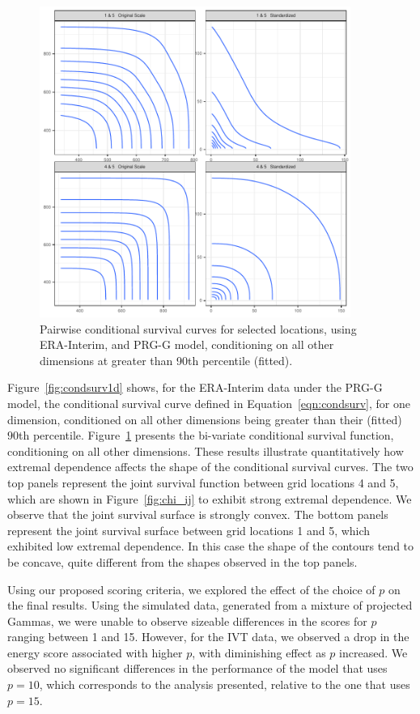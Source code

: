 \begin{figure}[t]
    \centering
    \includegraphics[height=4in, width=4in]{./images/condsurv_2d}
    \caption{Pairwise conditional survival curves for selected locations, using 
        ERA-Interim, and PRG-G model, conditioning on all other dimensions at greater 
        than 90th percentile (fitted).\label{fig:condsurv2d}}
\end{figure}

Figure~\ref{fig:condsurv1d} shows, for the ERA-Interim data under the PRG-G model,  
    the conditional survival curve defined in Equation~\eqref{eqn:condsurv}, for one dimension, 
    conditioned on all other dimensions being greater than their (fitted) $90$th percentile. 
    Figure~\ref{fig:condsurv2d} presents the bi-variate conditional survival function,
    conditioning on all other dimensions.  These results illustrate quantitatively how 
    extremal dependence affects the shape of the conditional survival curves.  The two 
    top panels represent the joint survival function 
    between grid locations 4 and 5, which are shown in Figure~\ref{fig:chi_ij} to exhibit 
    strong  extremal dependence.  We observe that the joint survival surface 
    is strongly convex.  The bottom panels represent the joint survival surface between 
    grid locations 1 and 5, which exhibited low extremal dependence.  In this case the 
    shape of the contours tend to be concave, quite different from the shapes observed 
    in the top panels.

Using our proposed scoring criteria, we explored the effect of the choice of $p$ on the 
    final results. Using the simulated data, generated from a mixture of projected Gammas, 
    we were unable to observe sizeable differences in the scores for $p$ ranging between 
    1 and 15.   However, for the IVT data, we observed a drop in the energy score associated 
    with higher $p$, with diminishing effect as $p$ increased.  We observed no significant 
    differences in the performance of the model that uses $p=10$, which corresponds to the 
    analysis presented, relative to the one that uses $p=15$.
